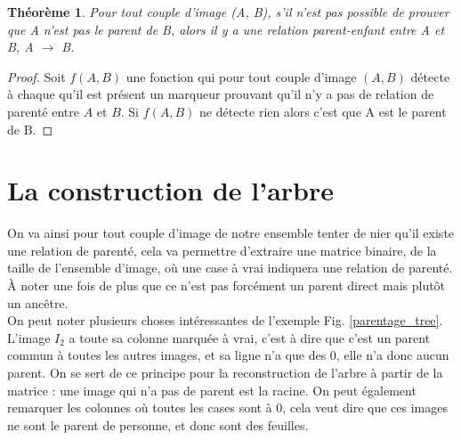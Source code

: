 \documentclass[utf8]{stageM2R} %
\begin{document}
\newtheorem*{parentage}{Théorème}
\begin{parentage}
  Pour tout couple d'image (A, B), s'il n'est pas possible de prouver que A n'est pas le parent de B, alors il y a une relation parent-enfant entre A et B, A $\to$ B.
\end{parentage}

\begin{proof}
  Soit $f(A,B)$ une fonction qui pour tout couple d'image $(A, B)$ détecte à chaque qu'il est présent un marqueur prouvant qu'il n'y a pas de relation de parenté entre $A$ et $B$. Si $f(A,B)$ ne détecte rien alors c'est que A est le parent de B.
\end{proof}

\section{La construction de l'arbre}
On va ainsi pour tout couple d'image de notre ensemble tenter de nier qu'il existe une relation de parenté, cela va permettre d'extraire une matrice binaire, de la taille de l'ensemble d'image, où une case à vrai indiquera une relation de parenté. À noter une fois de plus que ce n'est pas forcément un parent direct mais plutôt un ancêtre. \\ \indent
On peut noter plusieurs choses intéressantes de l'exemple Fig. \ref{parentage_tree}. L'image $I_{2}$ a toute sa colonne marquée à vrai, c'est à dire que c'est un parent commun à toutes les autres images, et sa ligne n'a que des 0, elle n'a donc aucun parent. On se sert de ce principe pour la reconstruction de l'arbre à partir de la matrice : une image qui n'a pas de parent est la racine. On peut également remarquer les colonnes où toutes les cases sont à 0, cela veut dire que ces images ne sont le parent de personne, et donc sont des feuilles.
\end{document}
